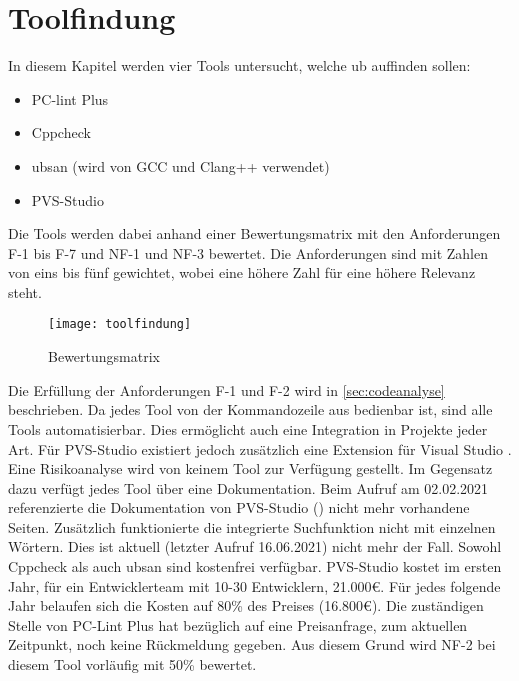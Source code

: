 \chapter{Toolfindung}
\label{ch:toolfindung}

In diesem Kapitel werden vier Tools untersucht, welche \gls{ub} auffinden sollen:
\begin{itemize}
  \item PC-lint Plus \cite{misc:pclintplus}
  \item Cppcheck \cite{misc:cppcheck}
  \item \gls{ubsan} (wird von GCC und Clang++ verwendet) \cite{misc:ubsan}
  \item PVS-Studio \cite{misc:pvsstudio}
\end{itemize}
Die Tools werden dabei anhand einer Bewertungsmatrix mit den Anforderungen F-1 bis F-7 und NF-1 und NF-3 bewertet. Die Anforderungen sind mit Zahlen von eins bis fünf gewichtet, wobei
eine höhere Zahl für eine höhere Relevanz steht.
\begin{figure}[htpb]
  \centering
  \texttt{[image: toolfindung]}
  \caption{Bewertungsmatrix}
  \label{img:toolfindung}
\end{figure}

Die Erfüllung der Anforderungen F-1 und F-2 wird in \ref{sec:codeanalyse} beschrieben. \newline
Da jedes Tool von der Kommandozeile aus bedienbar ist, sind alle Tools automatisierbar. Dies ermöglicht auch eine Integration in Projekte jeder Art. Für PVS-Studio existiert jedoch
zusätzlich eine Extension für Visual Studio \cite{misc:pvsplugin}. \newline
Eine Risikoanalyse wird von keinem Tool zur Verfügung gestellt. \newline
Im Gegensatz dazu verfügt jedes Tool über eine Dokumentation. Beim Aufruf am 02.02.2021 referenzierte die Dokumentation von PVS-Studio (\cite{misc:pvsdoku}) nicht mehr vorhandene Seiten. Zusätzlich
funktionierte die integrierte Suchfunktion nicht mit einzelnen Wörtern. Dies ist aktuell (letzter Aufruf 16.06.2021) nicht mehr der Fall.\newline
Sowohl Cppcheck als auch \gls{ubsan} sind kostenfrei verfügbar. \newline
PVS-Studio kostet im ersten Jahr, für ein Entwicklerteam mit 10-30 Entwicklern, 21.000€. Für jedes folgende Jahr belaufen sich die Kosten auf 80\% des Preises (16.800€).\newline
Die zuständigen Stelle von PC-Lint Plus hat bezüglich auf eine Preisanfrage, zum aktuellen Zeitpunkt, noch keine Rückmeldung gegeben. Aus diesem Grund wird NF-2 bei diesem Tool
vorläufig mit 50\% bewertet.


